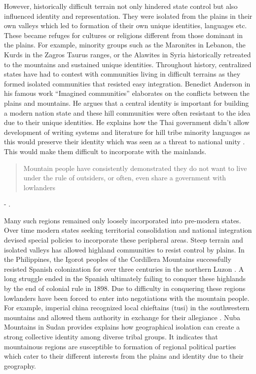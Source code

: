 \vspace{0.3cm}

However, historically difficult terrain not only hindered state control but also influenced identity and representation. They were isolated from the plains in their own valleys which led to formation of their own unique identities, languages etc. These became refuges for cultures or religions different from those dominant in the plains. For example, minority groups such as the Maronites in Lebanon, the Kurds in the Zagros Taurus ranges, or the Alawites in Syria historically retreated to the mountains and sustained unique identities.
 Throughout history, centralized states have had to contest with communities living in difficult terrains as they formed isolated communities that resisted easy integration. Benedict Anderson in his famous work ``Imagined communities'' elaborates on the conflicts between the plains and mountains. He argues that a central identity is important for building a modern nation state and these hill communities were often resistant to the idea due to their unique identities. He explains how the Thai government didn't allow development of writing systems and literature for hill tribe minority languages as this would preserve their identity which was seen as a threat to national unity \citep{anderson1991imagined}. This would make them difficult to incorporate with the mainlands.  \begin{quote} Mountain people have consistently demonstrated they do not want to live under the rule of outsiders, or often, even share a government with lowlanders\end{quote} 

\hspace*{\fill} - \cite{Hammes2017}. 



Many such regions remained only loosely incorporated into pre-modern states. Over time modern states seeking territorial consolidation and national integration devised special policies to incorporate these peripheral areas. Steep terrain and isolated valleys has allowed highland communities to  resist control by plains. In the Philippines, the Igorot peoples of the Cordillera Mountains successfully resisted Spanish colonization for over three centuries in the northern Luzon \citep{scott1970igorot}. A long struggle ended in the Spanish ultimately failing to conquer these highlands by the end of colonial rule in 1898. Due to difficulty in conquering these regions lowlanders have been forced to enter into negotiations with the mountain people. For example, imperial china  recognized local chieftains (tusi) in the southwestern mountains and allowed them authority in exchange for their allegiance \citep{took2005native}. Nuba Mountains in Sudan provides explains how geographical isolation can create a strong collective identity among diverse tribal groups. It indicates that mountainous regions are susceptible to formation of regional political parties which cater to their different interests from the plains and identity due to their geography.

